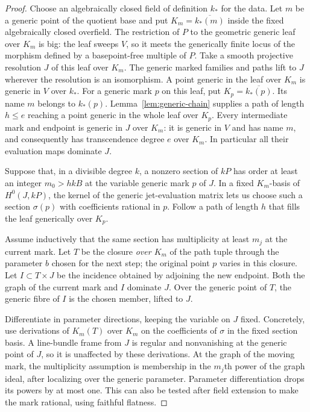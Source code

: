 \begin{proof}
Choose an algebraically closed field of definition $k_*$ for the data.
Let $m$ be a generic point of the quotient base and put
$K_m=\overline{k_*(m)}$ inside the fixed algebraically closed overfield.
The restriction of $P$ to the geometric
generic leaf over $K_m$ is big: the leaf sweeps $V$, so it meets the generically
finite locus of the morphism defined by a basepoint-free multiple of
$P$.  Take a smooth projective resolution $J$ of this leaf over $K_m$.
The generic marked families and paths lift to $J$ wherever the resolution
is an isomorphism.  A point generic in the leaf over $K_m$ is generic in
$V$ over $k_*$.  For a generic mark $p$ on this leaf, put $K_p=\overline{k_*(p)}$.
Its name $m$ belongs to $k_*(p)$. Lemma~\ref{lem:generic-chain} supplies
a path of length $h\le e$ reaching a point generic in the whole leaf over
$K_p$.  Every
intermediate mark and endpoint is generic in $J$ over $K_m$: it is
generic in $V$ and has name $m$, and consequently has transcendence
degree $e$ over $K_m$.  In particular all their evaluation maps dominate
$J$.

Suppose that, in a divisible degree $k$, a nonzero section of $kP$ has
order at least an integer $m_0>hkB$ at the variable generic mark $p$ of
$J$.  In a fixed $K_m$-basis of $H^0(J,kP)$, the kernel of the
generic jet-evaluation matrix lets us choose such a section
$\sigma(p)$ with coefficients rational in $p$.  Follow a path of length
$h$ that fills the leaf generically over $K_p$.

Assume inductively that the same section has multiplicity at least
$m_j$ at the current mark.  Let $T$ be the closure \emph{over $K_m$}
of the path tuple through the parameter $b$ chosen for the next step;
the original point $p$ varies in this closure.  Let
$I\subset T\times J$ be the incidence obtained by adjoining the new
endpoint.  Both the graph of the current mark and $I$ dominate $J$.
Over the generic point of $T$, the generic fibre of $I$ is the chosen
member, lifted to $J$.

Differentiate in parameter directions, keeping the variable on $J$
fixed.  Concretely, use derivations of $K_m(T)$ over $K_m$ on the
coefficients of $\sigma$ in the fixed section basis.  A line-bundle
frame from $J$ is regular and nonvanishing at the generic point of $J$,
so it is unaffected by these derivations.  At the graph of the moving
mark, the multiplicity assumption is membership in the $m_j$th power
of the graph ideal, after localizing over the generic parameter.
Parameter differentiation drops its powers by at most one.  This can
also be tested after field extension to make the mark rational, using
faithful flatness.


\end{proof}
